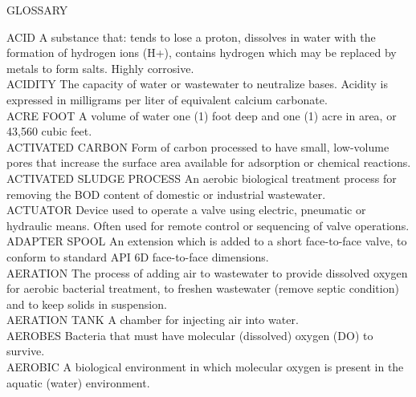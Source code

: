 \documentclass{article}
\begin{document}
\newpage
\vfill
\begin{center}
\Huge{GLOSSARY}
\end{center}
\vfill
ACID
A substance that: tends to lose a proton, dissolves in water with the formation of hydrogen ions (H+), contains hydrogen which may be replaced by metals to form salts. Highly corrosive.
\vspace{0.3cm}\\
ACIDITY
The capacity of water or wastewater to neutralize bases. Acidity is expressed in milligrams per liter of equivalent calcium carbonate.
\vspace{0.3cm}\\
ACRE FOOT
A volume of water one (1) foot deep and one (1) acre in area, or 43,560 cubic feet.
\vspace{0.3cm}\\
ACTIVATED CARBON
Form of carbon processed to have small, low-volume pores that increase the surface area available for adsorption or chemical reactions.
\vspace{0.3cm}\\
ACTIVATED SLUDGE PROCESS
An aerobic biological treatment process for removing the BOD content of domestic or industrial wastewater.
\vspace{0.3cm}\\
ACTUATOR
Device used to operate a valve using electric, pneumatic or hydraulic means. Often used for remote control or sequencing of valve operations.
\vspace{0.3cm}\\
ADAPTER SPOOL
An extension which is added to a short face-to-face valve, to conform to standard API 6D face-to-face dimensions.
\vspace{0.3cm}\\
AERATION
The process of adding air to wastewater to provide dissolved oxygen for aerobic bacterial treatment, to freshen wastewater (remove septic condition) and to keep solids in suspension.
\vspace{0.3cm}\\
AERATION TANK
A chamber for injecting air into water.
\vspace{0.3cm}\\
AEROBES
Bacteria that must have molecular (dissolved) oxygen (DO) to survive.
\vspace{0.3cm}\\
AEROBIC
A biological environment in which molecular oxygen is present in the aquatic (water) environment. 
\vspace{0.3cm}\\
\end{document}
